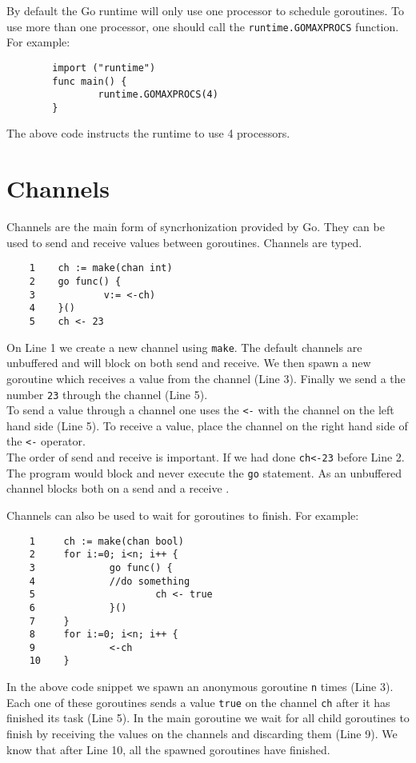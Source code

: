 \documentclass[8pt, twocolumn]{article}
\begin{document}
By default the Go runtime will only use one processor to schedule
goroutines. To use more than one processor, one should call the
\verb=runtime.GOMAXPROCS= function. For example:
\begin{verbatim}
        import ("runtime")        
        func main() {
                runtime.GOMAXPROCS(4)
        }
\end{verbatim}
The above code instructs the runtime to use 4 processors.

\section{Channels}
Channels are the main form of syncrhonization provided by Go. They can
be used to send and receive values between goroutines. Channels are
typed.
\begin{verbatim}
    1    ch := make(chan int)                         
    2    go func() {
    3            v:= <-ch)
    4    }()
    5    ch <- 23  
\end{verbatim}
On Line 1 we create a new channel using \verb=make=. The default
channels are unbuffered and will block on both send and receive. We
then spawn a new goroutine which receives a value from the channel
(Line 3). Finally we send a the number \verb=23= through the channel
(Line 5).\\

To send a value through a channel one uses the \verb=<-= with the
channel on the left hand side (Line 5). To receive a value, place the
channel on the right hand side of the \verb=<-= operator. \\

The order of send and receive is important. If we had done
\verb=ch<-23= before Line 2. The program would block and never execute
the \verb=go= statement. As an unbuffered channel blocks
both on a send and a receive \cite{effectivego}.

Channels can also be used to wait for goroutines to finish. For
example:
\begin{verbatim}
    1     ch := make(chan bool)
    2     for i:=0; i<n; i++ {
    3             go func() {
    4             //do something
    5                     ch <- true
    6             }()
    7     }
    8     for i:=0; i<n; i++ {
    9             <-ch 
    10    } 
\end{verbatim}
In the above code snippet we spawn an anonymous goroutine \verb=n=
times (Line 3). Each one of these goroutines sends a value \verb=true=
on the channel \verb=ch= after it has finished its task (Line 5). In
the main goroutine we wait for all child goroutines to finish by
receiving the values on the channels and discarding them (Line 9). We
know that after Line 10, all the spawned goroutines have finished.\\
\end{document}
